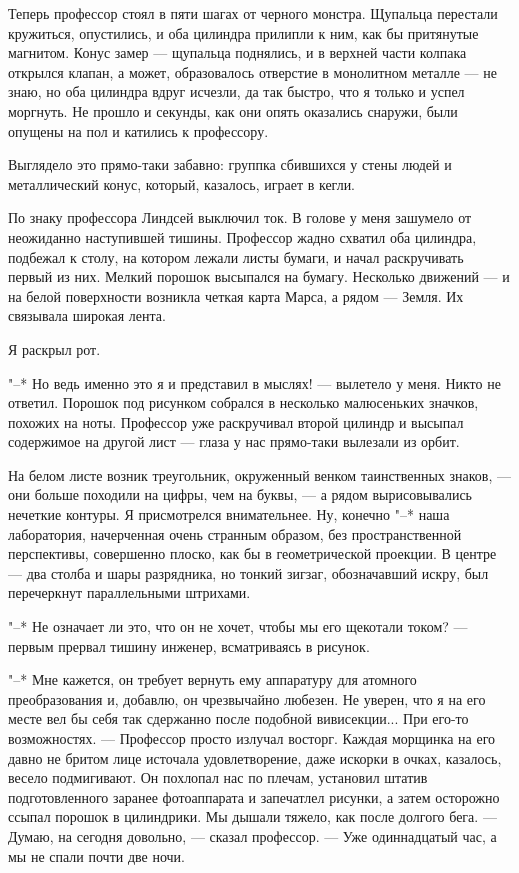 Теперь профессор стоял  в  пяти  шагах  от  черного  монстра.  Щупальца
перестали кружиться, опустились, и оба цилиндра прилипли  к  ним,  как  бы
притянутые магнитом. Конус замер --- щупальца поднялись, и в  верхней  части
колпака открылся клапан, а  может,  образовалось  отверстие  в  монолитном
металле --- не знаю, но оба цилиндра вдруг исчезли, да  так  быстро,  что  я
только и успел моргнуть. Не прошло и  секунды,  как  они  опять  оказались
снаружи, были опущены на пол и катились к профессору.

Выглядело это прямо-таки забавно: группка сбившихся  у  стены  людей  и
металлический конус, который, казалось, играет в кегли.

По знаку профессора Линдсей выключил ток. В голове у меня  зашумело  от
неожиданно наступившей  тишины.  Профессор  жадно  схватил  оба  цилиндра,
подбежал к столу, на котором лежали листы  бумаги,  и  начал  раскручивать
первый из них. Мелкий порошок высыпался на бумагу. Несколько движений ---  и
на белой поверхности возникла четкая карта Марса,  а  рядом  ---  Земля.  Их
связывала широкая лента.

Я раскрыл рот.

"--* Но ведь именно это я и представил в мыслях! --- вылетело у меня.  Никто
не ответил. Порошок под рисунком собрался в несколько малюсеньких значков,
похожих на ноты.  Профессор  уже  раскручивал  второй  цилиндр  и  высыпал
содержимое на другой лист --- глаза у нас прямо-таки вылезали из орбит.

На белом  листе  возник  треугольник,  окруженный  венком  таинственных
знаков, ---  они  больше  походили  на  цифры,  чем  на  буквы,  ---  а  рядом
вырисовывались нечеткие контуры. Я присмотрелся внимательнее. Ну,  конечно
"--*   наша   лаборатория,   начерченная   очень   странным   образом,    без
пространственной перспективы, совершенно плоско, как бы  в  геометрической
проекции. В центре --- два столба  и  шары  разрядника,  но  тонкий  зигзаг,
обозначавший искру, был перечеркнут параллельными штрихами.

"--* Не означает ли это, что он не хочет, чтобы мы его щекотали  током?  ---
первым прервал тишину инженер, всматриваясь в рисунок.

"--*  Мне  кажется,  он  требует  вернуть  ему  аппаратуру  для   атомного
преобразования и, добавлю, он чрезвычайно любезен. Не уверен, что я на его
месте вел бы себя так сдержанно после подобной  вивисекции...  При  его-то
возможностях. --- Профессор просто излучал восторг. Каждая морщинка  на  его
давно не бритом  лице  источала  удовлетворение,  даже  искорки  в  очках,
казалось, весело подмигивают. Он похлопал нас по плечам, установил  штатив
подготовленного  заранее  фотоаппарата  и  запечатлел  рисунки,  а   затем
осторожно ссыпал порошок в цилиндрики. Мы дышали тяжело, как после долгого
бега. --- Думаю, на сегодня довольно, --- сказал профессор. --- Уже одиннадцатый
час, а мы не спали почти две ночи.

